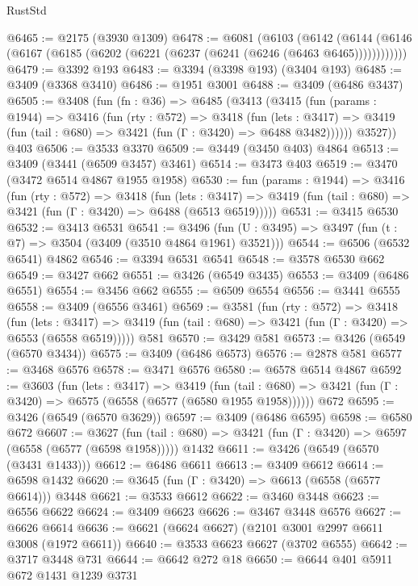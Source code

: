 \begin{lexlean}{RustStd}
\begin{coremodule}
@6465 := @2175 (@3930 @1309)
@6478 := @6081
    (@6103
      (@6142 (@6144 (@6146 (@6167 (@6185 (@6202 (@6221 (@6237 (@6241 (@6246 (@6463 @6465))))))))))))
@6479 := @3392 @193
@6483 := @3394 (@3398 @193) (@3404 @193)
@6485 := @3409 (@3368 @3410)
@6486 := @1951 @3001
@6488 := @3409 (@6486 @3437)
@6505 := @3408
    (fun (fn : @36) =>
    @6485
      (@3413
        (@3415
          (fun (params : @1944) =>
          @3416
            (fun (rty : @572) =>
            @3418
              (fun (lets : @3417) =>
              @3419 (fun (tail : @680) => @3421 (fun (Γ : @3420) => @6488 @3482))))))
        @3527))
    @403
@6506 := @3533 @3370
@6509 := @3449 (@3450 @403) @4864
@6513 := @3409 (@3441 (@6509 @3457) @3461)
@6514 := @3473 @403
@6519 := @3470 (@3472 @6514 @4867 @1955 @1958)
@6530 := fun (params : @1944) =>
  @3416
    (fun (rty : @572) =>
    @3418
      (fun (lets : @3417) =>
      @3419 (fun (tail : @680) => @3421 (fun (Γ : @3420) => @6488 (@6513 @6519)))))
@6531 := @3415 @6530
@6532 := @3413 @6531
@6541 := @3496 (fun (U : @3495) => @3497 (fun (t : @7) => @3504 (@3409 (@3510 @4864 @1961) @3521)))
@6544 := @6506 (@6532 @6541) @4862
@6546 := @3394 @6531 @6541
@6548 := @3578 @6530 @662
@6549 := @3427 @662
@6551 := @3426 (@6549 @3435)
@6553 := @3409 (@6486 @6551)
@6554 := @3456 @662
@6555 := @6509 @6554
@6556 := @3441 @6555
@6558 := @3409 (@6556 @3461)
@6569 := @3581
    (fun (rty : @572) =>
    @3418
      (fun (lets : @3417) =>
      @3419 (fun (tail : @680) => @3421 (fun (Γ : @3420) => @6553 (@6558 @6519)))))
    @581
@6570 := @3429 @581
@6573 := @3426 (@6549 (@6570 @3434))
@6575 := @3409 (@6486 @6573)
@6576 := @2878 @581
@6577 := @3468 @6576
@6578 := @3471 @6576
@6580 := @6578 @6514 @4867
@6592 := @3603
    (fun (lets : @3417) =>
    @3419
      (fun (tail : @680) => @3421 (fun (Γ : @3420) => @6575 (@6558 (@6577 (@6580 @1955 @1958))))))
    @672
@6595 := @3426 (@6549 (@6570 @3629))
@6597 := @3409 (@6486 @6595)
@6598 := @6580 @672
@6607 := @3627
    (fun (tail : @680) => @3421 (fun (Γ : @3420) => @6597 (@6558 (@6577 (@6598 @1958)))))
    @1432
@6611 := @3426 (@6549 (@6570 (@3431 @1433)))
@6612 := @6486 @6611
@6613 := @3409 @6612
@6614 := @6598 @1432
@6620 := @3645 (fun (Γ : @3420) => @6613 (@6558 (@6577 @6614))) @3448
@6621 := @3533 @6612
@6622 := @3460 @3448
@6623 := @6556 @6622
@6624 := @3409 @6623
@6626 := @3467 @3448 @6576
@6627 := @6626 @6614
@6636 := @6621 (@6624 @6627) (@2101 @3001 @2997 @6611 @3008 (@1972 @6611))
@6640 := @3533 @6623 @6627 (@3702 @6555)
@6642 := @3717 @3448 @731
@6644 := @6642 @272 @18
@6650 := @6644 @401 @5911 @672 @1431 @1239 @3731

\end{coremodule}
\end{lexlean}
